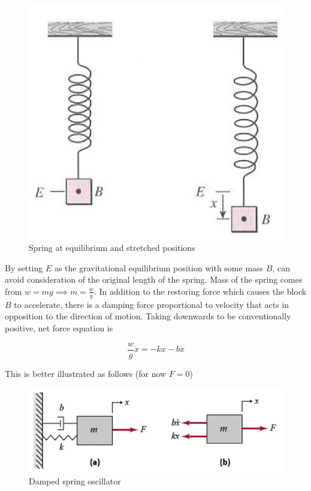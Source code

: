 \begin{figure}[H]
    \centering
    \includegraphics[scale=0.8]{figures/Screen Shot 2021-12-05 at 5.16.10 PM.png}
    \caption{Spring at equilibrium and stretched positions}
\end{figure}

By setting $E$ as the gravitational equilibrium position with some mass $B$, can avoid consideration of the original length of the spring.
Mass of the spring comes from $w=mg\implies m = \frac{w}{g}$. In addition to the restoring force which causes the block $B$ to accelerate, there is a
damping force proportional to velocity that acts in opposition to the direction of motion. Taking downwards to be conventionally positive, net force equation is

\begin{equation}
    \frac{w}{g}\ddot x=-kx-b\dot x
\end{equation}

This is better illustrated as follows (for now $F=0$)

\begin{figure}[H]
    \centering
    \includegraphics[scale=0.6]{figures/a-Mass-Spring-Damper-System-b-free-body-diagram.jpg}
    \caption{Damped spring oscillator}
\end{figure}

